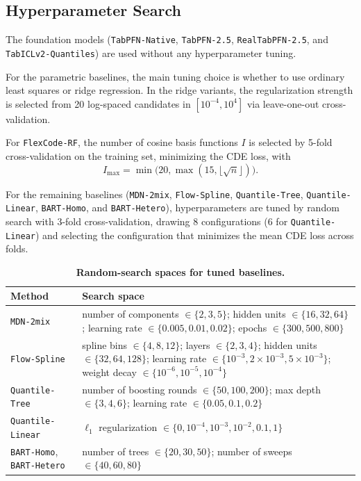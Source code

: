 \documentclass{article}
\newcommand{\method}[1]{\texttt{#1}}
\begin{document}
\subsection{Hyperparameter Search}
\label{app:tuning_details}

The foundation models (\method{TabPFN-Native}, \method{TabPFN-2.5},
\method{RealTabPFN-2.5}, and \method{TabICLv2-Quantiles}) are used without any
hyperparameter tuning.

For the parametric baselines, the main tuning choice is whether to use ordinary
least squares or ridge regression. In the ridge variants, the regularization
strength is selected from 20 log-spaced candidates in $[10^{-4},10^4]$ via
leave-one-out cross-validation.

For \method{FlexCode-RF}, the number of cosine basis functions $I$ is selected
by 5-fold cross-validation on the training set, minimizing the CDE loss, with
\[
I_{\max}=\min\bigl(20,\max(15,\lfloor\sqrt{n}\rfloor)\bigr).
\]

For the remaining baselines
(\method{MDN-2mix}, \method{Flow-Spline}, \method{Quantile-Tree},
\method{Quantile-Linear}, \method{BART-Homo}, and \method{BART-Hetero}),
hyperparameters are tuned by random search with 3-fold cross-validation,
drawing 8 configurations (6 for \method{Quantile-Linear}) and selecting the
configuration that minimizes the mean CDE loss across folds.

\begin{table}[t]
\centering
\caption{\textbf{Random-search spaces for tuned baselines.}}
\label{tab:hyperparams}
\small
\begin{tabular}{lp{9cm}}
\toprule
\textbf{Method} & \textbf{Search space} \\
\midrule
\method{MDN-2mix} &
number of components $\in \{2,3,5\}$; hidden units $\in \{16,32,64\}$;
learning rate $\in \{0.005,0.01,0.02\}$; epochs $\in \{300,500,800\}$ \\
\method{Flow-Spline} &
spline bins $\in \{4,8,12\}$; layers $\in \{2,3,4\}$;
hidden units $\in \{32,64,128\}$;
learning rate $\in \{10^{-3},2\times 10^{-3},5\times 10^{-3}\}$;
weight decay $\in \{10^{-6},10^{-5},10^{-4}\}$ \\
\method{Quantile-Tree} &
number of boosting rounds $\in \{50,100,200\}$;
max depth $\in \{3,4,6\}$;
learning rate $\in \{0.05,0.1,0.2\}$ \\
\method{Quantile-Linear} &
$\ell_1$ regularization $\in \{0,10^{-4},10^{-3},10^{-2},0.1,1\}$ \\
\method{BART-Homo}, \method{BART-Hetero} &
number of trees $\in \{20,30,50\}$;
number of sweeps $\in \{40,60,80\}$ \\
\bottomrule
\end{tabular}
\end{table}
\end{document}
